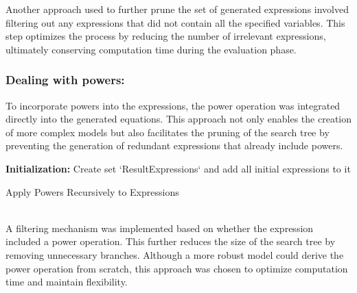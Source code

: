 \documentclass{article}
\begin{document}
Another approach used to further prune the set of generated expressions involved filtering out any expressions that did not contain all the specified variables. This step optimizes the process by reducing the number of irrelevant expressions, ultimately conserving computation time during the evaluation phase.\\



\subsubsection{Dealing with powers:}

To incorporate powers into the expressions, the power operation was integrated directly into the generated equations. This approach not only enables the creation of more complex models but also facilitates the pruning of the search tree by preventing the generation of redundant expressions that already include powers.\\




\begin{algorithm}[H]
\SetAlgoLined
{}

\textbf{Initialization:}\;
Create set `ResultExpressions` and add all initial expressions to it\;



\caption{Apply Powers Recursively to Expressions}
\label{alg:apply_powers} %
\end{algorithm}\\




A filtering mechanism was implemented based on whether the expression included a power operation. This further reduces the size of the search tree by removing unnecessary branches. Although a more robust model could derive the power operation from scratch, this approach was chosen to optimize computation time and maintain flexibility.\\
\end{document}
